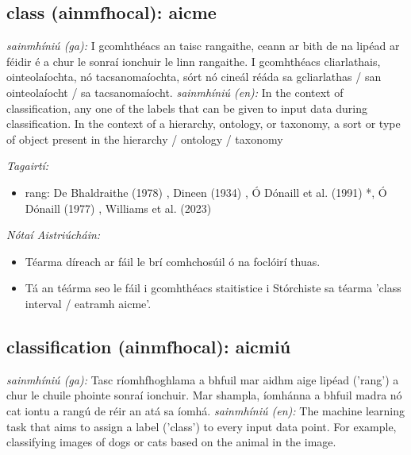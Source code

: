 \documentclass{article}
\begin{document}
\subsection*{class (ainmfhocal): aicme} 
 \noindent \textit{sainmhíniú (ga):} I gcomhthéacs an taisc rangaithe, ceann ar bith de na lipéad ar féidir é a chur le sonraí ionchuir le linn rangaithe. I gcomhthéacs cliarlathais, ointeolaíochta, nó tacsanomaíochta, sórt nó cineál réáda sa gcliarlathas / san ointeolaíocht / sa tacsanomaíocht.
\newline\newline
 \noindent \textit{sainmhíniú (en):} In the context of classification, any one of the labels that can be given to input data during classification. In the context of a hierarchy, ontology, or taxonomy, a sort or type of object present in the hierarchy / ontology / taxonomy
\newline

 \noindent \textit{Tagairtí:}
\begin{itemize}
	\item rang: De Bhaldraithe (1978) \cite{de-bhaldraithe}, Dineen (1934) \cite{dineen}, Ó Dónaill et al. (1991) \cite{focloir-beag}*, Ó Dónaill (1977) \cite{odonaill}, Williams et al. (2023) \cite{storchiste}
\end{itemize}

 \noindent \textit{Nótaí Aistriúcháin:}
\begin{itemize}
	\item Téarma díreach ar fáil le brí comhchosúil ó na foclóirí thuas.
	\item Tá an téárma seo le fáil i gcomhthéacs staitistice i Stórchiste sa téarma 'class interval / eatramh aicme'.
\end{itemize}


\subsection*{classification (ainmfhocal): aicmiú} 
 \noindent \textit{sainmhíniú (ga):} Tasc ríomhfhoghlama a bhfuil mar aidhm aige lipéad ('rang') a chur le chuile phointe sonraí ionchuir. Mar shampla, íomhánna a bhfuil madra nó cat iontu a rangú de réir an  atá sa íomhá.
\newline\newline
 \noindent \textit{sainmhíniú (en):} The machine learning task that aims to assign a label ('class') to every input data point. For example, classifying images of dogs or cats based on the animal in the image.
\newline
\end{document}
